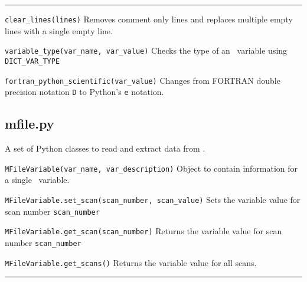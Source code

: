 \rule{\textwidth}{0.4pt}

\begin{description}

\item{\verb|clear_lines(lines)|} Removes comment only lines and replaces
  multiple empty lines with a single empty line.

\item{\verb|variable_type(var_name, var_value)|} Checks the type of an \indat\
  variable using \verb|DICT_VAR_TYPE|

\item{\verb|fortran_python_scientific(var_value)|} Changes from FORTRAN double
  precision notation \verb|D| to Python's \verb|e| notation.

\end{description}

\subsection{mfile.py}

A set of Python classes to read and extract data from \mfile.

\begin{description}

\item{\verb|MFileVariable(var_name, var_description)|} Object to contain
  information for a single \mfile\ variable.

\item{\verb|MFileVariable.set_scan(scan_number, scan_value)|} Sets the
  variable value for scan number \verb|scan_number|

\item{\verb|MFileVariable.get_scan(scan_number)|} Returns the variable value
  for scan number \verb|scan_number|

\item{\verb|MFileVariable.get_scans()|} Returns the variable value for all
  scans.

\end{description}

\rule{\textwidth}{0.4pt}

